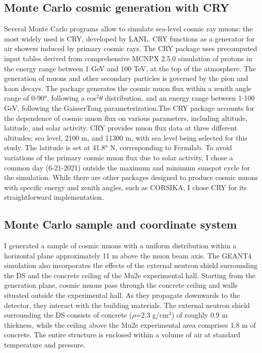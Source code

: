 \subsection{Monte Carlo cosmic generation with CRY}
Several Monte Carlo programs allow to simulate sea-level 
cosmic ray muons: the most widely used is CRY, developed 
by LANL.
%
CRY functions as a generator for air showers 
induced by primary cosmic rays. The CRY package uses 
precomputed input tables derived from comprehensive 
MCNPX 2.5.0 simulation of protons in the energy range 
between 1 GeV and 100 TeV, at the top of the atmosphere.
The generation of muons and other secondary particles 
is governed by the pion and kaon decays. The package 
generates the cosmic muon flux within a zenith angle range 
of 0-90°, following a cos$^2 \theta$ distribution, and an 
energy range between 1-100 GeV, following the Gaisser\add{-}Tang
parameterization.The CRY package accounts for the 
dependence of cosmic muon flux on various parameters, 
including altitude, latitude, and solar activity. CRY 
provides muon flux data at three different altitudes: 
sea level, 2100 m, and 11300 m, with sea level being 
selected for this study. The latitude is set at 41.8° N, 
corresponding to Fermilab. To avoid variations of the 
primary cosmic muon flux due to solar activity, I chose 
a common day (6-21-2021) outside the maximum and minimum 
sunspot cycle for the simulation. While there are other 
packages designed to produce cosmic muons with specific 
energy and zenith angles, such as CORSIKA, I chose CRY 
for its straightforward implementation.

\subsection{Monte Carlo sample and coordinate system }\label{genplane}
I generated a sample of cosmic muons with a uniform distribution within a
horizontal plane approximately 11 m above the muon beam axis. The GEANT4 
simulation also incorporates the effects of the external neutron shield surrounding the DS 
and the concrete ceiling of the Mu2e experimental hall. Starting from the generation plane, 
cosmic muons pass through the concrete ceiling and walls situated outside the experimental hall. 
As they propagate downwards to the detector, they interact with the building materials. 
The external neutron shield surrounding the DS consists of concrete ($\rho$=2.3 g/cm$^3$) of  
roughly 0.9 m thickness, while the ceiling above the Mu2e experimental area comprises 1.8 m of concrete. 
The entire structure is enclosed within a volume of air at standard temperature and pressure.

